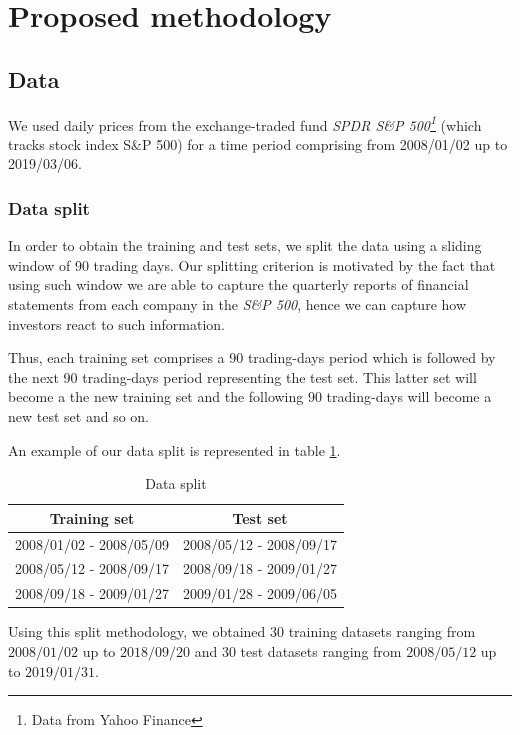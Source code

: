 \documentclass[preprint,3p,twocolumn]{elsarticle}
\begin{document}
\section{Proposed methodology}
\label{sec:proposed methodology}
\subsection{Data}
\label{subsec:data}
We used daily prices from the exchange-traded fund \textit{SPDR S\&P 500\footnote{Data from Yahoo Finance}} (which tracks stock index S\&P 500) for a time period comprising from 2008/01/02 up to 2019/03/06.

\subsubsection{Data split}
\label{subsubsec:data split}
In order to obtain the training and test sets, we split the data using a sliding window of 90 trading days. Our splitting criterion is motivated by the fact that using such window we are able to capture the quarterly reports of financial statements from each company in the \textit{S\&P 500}, hence we can capture how investors react to such information.

Thus, each training set comprises a 90 trading-days period which is followed by the next 90 trading-days period representing the test set. This latter set will become a the new training set and the following 90 trading-days will become a new test set and so on.

An example of our data split is represented in table \ref{table:data split}.

\begin{table}[h]
\centering
\begin{tabular}{cc}
\hline
\textbf{Training set} & \textbf{Test set} \\
\hline
2008/01/02 - 2008/05/09 & 2008/05/12 - 2008/09/17 \\
2008/05/12 - 2008/09/17 & 2008/09/18 - 2009/01/27 \\
2008/09/18 - 2009/01/27 & 2009/01/28 - 2009/06/05 \\
\hline
\end{tabular}
\caption{\label{table:data split} Data split}
\end{table}

Using this split methodology, we obtained $30$ training datasets ranging from $2008/01/02$ up to $2018/09/20$ and $30$ test datasets ranging from $2008/05/12$ up to $2019/01/31$.
\end{document}
